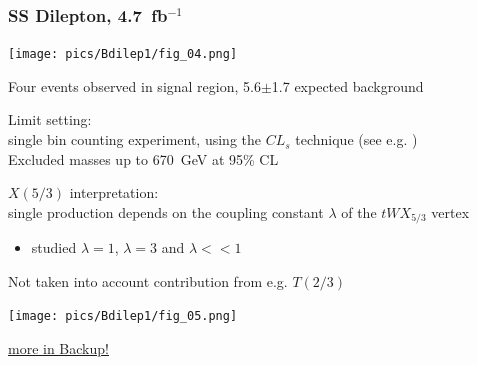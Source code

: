 \documentclass[xcolor=dvipsnames,10pt]{beamer}
\newcommand{\ifb}{~fb$^{-1}$}
\begin{document}
\begin{frame}\frametitle{SS Dilepton, 4.7\ifb~\cite{ATLAS-CONF-2012-130}} %
\footnotesize\centering

\begin{minipage}{1.\textwidth}

\begin{minipage}{.5\textwidth}
\centering
\vspace{\baselineskip}

\texttt{[image: pics/Bdilep1/fig\_04.png]}

\end{minipage}\begin{minipage}{.5\textwidth}
\centering

Four events observed in signal region, 5.6$\pm$1.7 expected background\\

\vspace{\baselineskip}

Limit setting:\\
single bin counting experiment, using the $CL_s$ technique (see e.g. \cite{Junk:1999kv,Read:2002hq})\\
Excluded masses up to  \alert{670~GeV} at 95\% CL
\end{minipage}
\end{minipage}

\begin{minipage}{1.\textwidth}

\begin{minipage}{.5\textwidth}
\centering

$X(5/3)$ interpretation:\\
single production depends on the coupling constant $\lambda$ of the $tWX_{5/3}$ vertex
\begin{itemize}
\item studied $\lambda=1$, $\lambda=3$ and $\lambda << 1$
\end{itemize}
Not taken into account contribution from e.g. $T(2/3)$

\end{minipage}\begin{minipage}{.5\textwidth}
\centering

\vspace{-\baselineskip}
\vspace{-\baselineskip}
\vspace{-\baselineskip}

\texttt{[image: pics/Bdilep1/fig\_05.png]}

\end{minipage}
\vspace{-\baselineskip}
\centering
\scriptsize \hyperlink{Bdilep1}{more in Backup!}
\end{minipage}



\end{frame}
\end{document}
